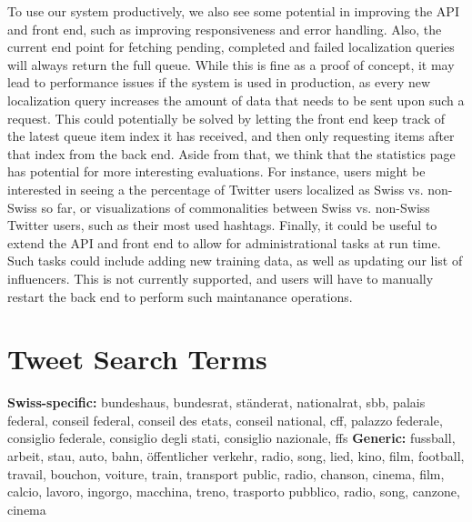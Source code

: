 \documentclass[10pt,a4paper]{article}
\begin{document}
To use our system productively, we also see some potential in improving the API and front end, such as improving responsiveness and error handling. Also, the current end point for fetching pending, completed and failed localization queries will always return the full queue. While this is fine as a proof of concept, it may lead to performance issues if the system is used in production, as every new localization query increases the amount of data that needs to be sent upon such a request. This could potentially be solved by letting the front end keep track of the latest queue item index it has received, and then only requesting items after that index from the back end. Aside from that, we think that the statistics page has potential for more interesting evaluations. For instance, users might be interested in seeing a the percentage of Twitter users localized as Swiss vs. non-Swiss so far, or visualizations of commonalities between Swiss vs. non-Swiss Twitter users, such as their most used hashtags. Finally, it could be useful to extend the API and front end to allow for administrational tasks at run time. Such tasks could include adding new training data, as well as updating our list of influencers. This is not currently supported, and users will have to manually restart the back end to perform such maintanance operations.

\clearpage



\clearpage
\appendix
\section{Tweet Search Terms}
\label{sec:appendix-searchterms}
\textbf{Swiss-specific:} bundeshaus, bundesrat, ständerat, nationalrat, sbb, palais federal, conseil federal, conseil des etats, conseil national, cff, palazzo federale, consiglio federale, consiglio degli stati, consiglio nazionale, ffs
\bigbreak
\noindent\textbf{Generic:} fussball, arbeit, stau, auto, bahn, öffentlicher verkehr, radio, song, lied, kino, film, football, travail, bouchon, voiture, train, transport public, radio, chanson, cinema, film, calcio, lavoro, ingorgo, macchina, treno, trasporto pubblico, radio, song, canzone, cinema
\end{document}
